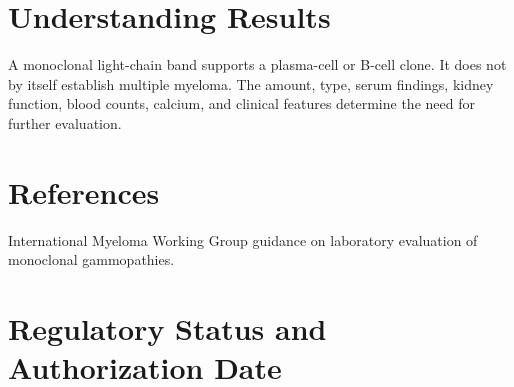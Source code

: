 \section*{Understanding Results}
A monoclonal light-chain band supports a plasma-cell or B-cell clone. It does not by itself establish multiple myeloma. The amount, type, serum findings, kidney function, blood counts, calcium, and clinical features determine the need for further evaluation.

\section*{References}
International Myeloma Working Group guidance on laboratory evaluation of monoclonal gammopathies.

\clearpage


\section*{Regulatory Status and Authorization Date}

\clearpage
